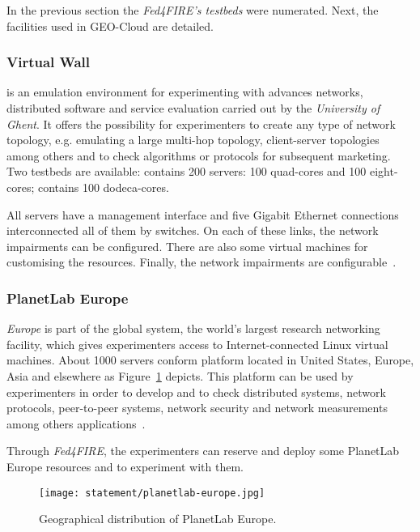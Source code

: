 In the previous section the \emph{Fed4FIRE's testbeds} were numerated. Next, the
facilities used in GEO-Cloud are detailed.

\subsubsection{Virtual Wall}

\vw is an emulation environment for
experimenting with advances networks, distributed software and service
evaluation carried out by the \emph{University of Ghent}. It offers the possibility for experimenters to create any type of
network topology, e.g. emulating a large multi-hop topology, client-server
topologies among others and to check algorithms or protocols for subsequent
marketing.
Two \vw testbeds are available:  contains 200 servers: 100
quad-cores and 100 eight-cores;  contains 100 dodeca-cores.

All servers have a management interface and five Gigabit Ethernet connections
interconnected all of them by switches. On each of these links, the network
impairments can be configured. There are also some virtual machines for
customising the resources. Finally, the network
impairments are configurable~\cite{Wall2014}.

\subsubsection{PlanetLab Europe}

\pl \emph{Europe} is part of the \pl global system, the world's largest
research networking facility, which gives experimenters access to
Internet-connected Linux virtual machines. About 1000 servers conform \pl
platform located in United States, Europe, Asia and elsewhere as Figure~\ref{fig:intr-planetlab-europe} depicts.
This platform can be used by experimenters in order to develop and to check
distributed systems, network protocols, peer-to-peer systems, network security
and network measurements among others applications~\cite{Europe2014}.

Through \emph{Fed4FIRE}, the experimenters can reserve and deploy some
PlanetLab Europe resources and to experiment with them.

\begin{figure}[!h]
\begin{center}
\texttt{[image: statement/planetlab-europe.jpg]}
\caption{Geographical distribution of PlanetLab Europe.}
\label{fig:intr-planetlab-europe}
\end{center}
\end{figure}

